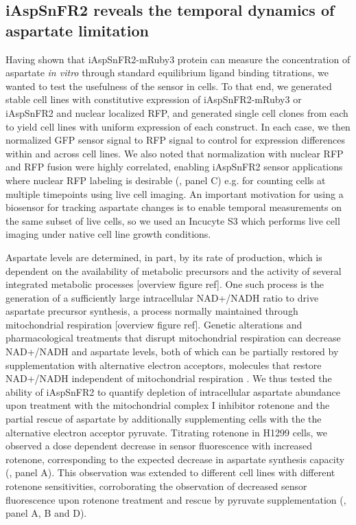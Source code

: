 \documentclass[9pt,lineno]{elife}
\begin{document}
\subsection{iAspSnFR2 reveals the temporal dynamics of aspartate limitation}
Having shown that iAspSnFR2-mRuby3 protein can measure the concentration of aspartate \textit{in vitro} through standard equilibrium ligand binding titrations, we wanted to test the usefulness of the sensor in cells.
To that end, we generated stable cell lines with constitutive expression of iAspSnFR2-mRuby3 or iAspSnFR2 and nuclear localized RFP, and generated single cell clones from each to yield cell lines with uniform expression of each construct.
In each case, we then normalized GFP sensor signal to RFP signal to control for expression differences within and across cell lines.
We also noted that normalization with nuclear RFP and RFP fusion were highly correlated, enabling iAspSnFR2 sensor applications where nuclear RFP labeling is desirable (, panel C) e.g. for counting cells at multiple timepoints using live cell imaging.
An important motivation for using a biosensor for tracking aspartate changes is to enable temporal measurements on the same subset of live cells, so we used an Incucyte S3 which performs live cell imaging under native cell line growth conditions.

Aspartate levels are determined, in part, by its rate of production, which is dependent on the availability of metabolic precursors and the activity of several integrated metabolic processes [overview figure ref].
One such process is the generation of a sufficiently large intracellular NAD+/NADH ratio to drive aspartate precursor synthesis, a process normally maintained through mitochondrial respiration [overview figure ref].
Genetic alterations and pharmacological treatments that disrupt mitochondrial respiration can decrease NAD+/NADH and aspartate levels, both of which can be partially restored by supplementation with alternative electron acceptors, molecules that restore NAD+/NADH independent of mitochondrial respiration \citep{Sullivan2015-xf, Birsoy2015-pg}.
We thus tested the ability of iAspSnFR2 to quantify depletion of intracellular aspartate abundance upon treatment with the mitochondrial complex I inhibitor rotenone and the partial rescue of aspartate by additionally supplementing cells with the the alternative electron acceptor pyruvate.
Titrating rotenone in H1299 cells, we observed a dose dependent decrease in sensor fluorescence with increased rotenone, corresponding to the expected decrease in aspartate synthesis capacity (, panel A).
This observation was extended to different cell lines with different rotenone sensitivities, corroborating the observation of decreased sensor fluorescence upon rotenone treatment and rescue by pyruvate supplementation (, panel A, B and D).
\end{document}
